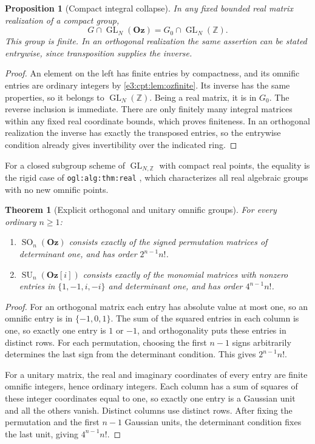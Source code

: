 \documentclass[11pt,letterpaper]{article}
\numberwithin{equation}{section}
\newtheorem{theorem}{Theorem}[section]
\newtheorem{proposition}[proposition]{Proposition}
\theoremstyle{definition}
\theoremstyle{remark}
\newcommand{\Z}{\mathbb Z}
\newcommand{\Oz}{\mathbf{Oz}}
\newcommand{\SO}{\operatorname{SO}}
\newcommand{\SU}{\operatorname{SU}}
\newcommand{\GL}{\operatorname{GL}}
\begin{document}
\begin{proposition}[Compact integral collapse]\label{e3:cpt:prop:ozcompact}
In any fixed bounded real matrix realization of a compact group,
\[
 G\cap\GL_N(\Oz)=G_0\cap\GL_N(\Z).
\]
This group is finite. In an orthogonal realization the same assertion can be
stated entrywise, since transposition supplies the inverse.
\end{proposition}
\begin{proof}
An element on the left has finite entries by compactness, and its omnific
entries are ordinary integers by \cref{e3:cpt:lem:ozfinite}. Its inverse has the
same properties, so it belongs to $\GL_N(\Z)$. Being a real matrix, it is in
$G_0$. The reverse inclusion is immediate. There are only finitely many integral
matrices within any fixed real coordinate bounds, which proves finiteness. In an
orthogonal realization the inverse has exactly the transposed entries, so the
entrywise condition already gives invertibility over the indicated ring.
\end{proof}

For a closed subgroup scheme of $\GL_{N,\Z}$ with compact real points, the
equality is the rigid case of \texttt{ogl:alg:thm:real} \cite{RepoOGL}, which
characterizes all real algebraic groups with no new omnific points.

\begin{theorem}[Explicit orthogonal and unitary omnific groups]\label{e3:cpt:thm:ozclassical}
For every ordinary $n\ge1$:
\begin{enumerate}[label=\textup{(\roman*)}]
\item $\SO_n(\Oz)$ consists exactly of the signed permutation matrices of
determinant one, and has order $2^{n-1}n!$.
\item $\SU_n(\Oz[i])$ consists exactly of the monomial matrices with nonzero
entries in $\{1,-1,i,-i\}$ and determinant one, and has order $4^{n-1}n!$.
\end{enumerate}
\end{theorem}
\begin{proof}
For an orthogonal matrix each entry has absolute value at most one, so an
omnific entry is in $\{-1,0,1\}$. The sum of the squared entries in each column
is one, so exactly one entry is $1$ or $-1$, and orthogonality puts these
entries in distinct rows. For each permutation, choosing the first $n-1$ signs
arbitrarily determines the last sign from the determinant condition. This gives
$2^{n-1}n!$.

For a unitary matrix, the real and imaginary coordinates of every entry are
finite omnific integers, hence ordinary integers. Each column has a sum of
squares of these integer coordinates equal to one, so exactly one entry is a
Gaussian unit and all the others vanish. Distinct columns use distinct rows.
After fixing the permutation and the first $n-1$ Gaussian units, the determinant
condition fixes the last unit, giving $4^{n-1}n!$.
\end{proof}
\end{document}
